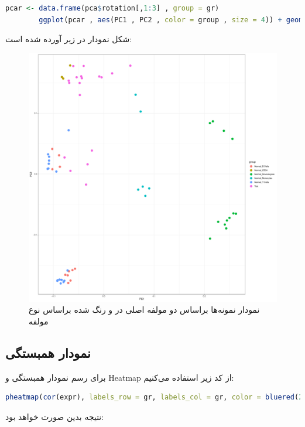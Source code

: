 \documentclass[12pt]{article}
\begin{document}
\begin{latin}
	\begin{lstlisting}[language=R]
		pcar <- data.frame(pca$rotation[,1:3] , group = gr)
		ggplot(pcar , aes(PC1 , PC2 , color = group , size = 4)) + geom_point()+ theme_bw()
	\end{lstlisting}
\end{latin} 

شکل نمودار در زیر آورده شده است:

\begin{figure}[h!]
	\centering	
	\includegraphics[width = 0.75 \textwidth ]{./Results/PCA_Samples.pdf}
	\caption{نمودار  نمونه‌ها براساس دو مولفه اصلی در  و رنگ شده براساس نوع مولفه}
	\label{fig:pcasamples}
\end{figure}





\subsection{نمودار همبستگی }

برای رسم نمودار همبستگی و Heatmap از کد زیر استفاده می‌کنیم:

\begin{latin}
	\begin{lstlisting}[language=R]
		pheatmap(cor(expr), labels_row = gr, labels_col = gr, color = bluered(256), border_color = NA)
	\end{lstlisting}
\end{latin}
نتیجه بدین صورت خواهد بود:
\end{document}
